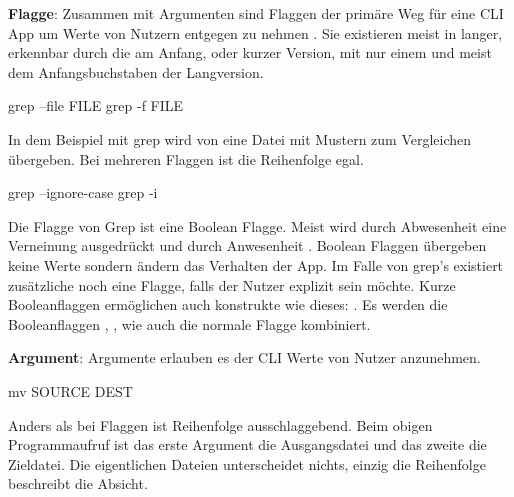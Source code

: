 \documentclass[oneside,bibliography=totocnumbered,BCOR=5mm]{scrbook}
\newenvironment{code}{\captionsetup{type=listing, skip=0pt}}{}
\begin{document}

\textbf{Flagge}: Zusammen mit Argumenten sind Flaggen der primäre Weg für eine
CLI App um Werte von Nutzern entgegen zu nehmen \parencite{12factor}. Sie
existieren meist in langer, erkennbar durch die \codeinline{--} am Anfang, oder
kurzer Version, mit nur einem \codeinline{-} und meist dem Anfangsbuchstaben der
Langversion.

\begin{code}
\begin{shellcode}
grep --file FILE
grep -f FILE
\end{shellcode}
\medskip
\end{code}

In dem Beispiel mit grep wird von  eine Datei mit
Mustern zum Vergleichen übergeben. Bei mehreren Flaggen ist die Reihenfolge
egal.

\begin{code}
  \begin{shellcode}
  grep --ignore-case
  grep -i
  \end{shellcode}
  \medskip
\end{code}

Die  Flagge von Grep ist eine Boolean Flagge. Meist
wird durch Abwesenheit eine Verneinung ausgedrückt und durch Anwesenheit
. Boolean Flaggen übergeben keine Werte sondern ändern das
Verhalten der App. Im Falle von grep's  existiert
zusätzliche noch eine  Flagge, falls der Nutzer
explizit sein möchte. Kurze Booleanflaggen ermöglichen auch konstrukte
wie dieses: . Es werden die Booleanflaggen
, , wie auch die normale 
Flagge kombiniert.

\textbf{Argument}: Argumente erlauben es der CLI Werte von Nutzer anzunehmen.

\begin{code}
  \begin{shellcode}
mv SOURCE DEST
  \end{shellcode}
  \medskip
\end{code}

Anders als bei Flaggen ist Reihenfolge ausschlaggebend. Beim obigen
 Programmaufruf ist das erste Argument die Ausgangsdatei und das
zweite die Zieldatei. Die eigentlichen Dateien unterscheidet nichts, einzig die
Reihenfolge beschreibt die Absicht.
\end{document}
